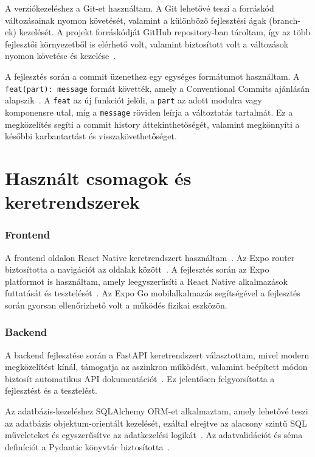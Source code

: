 \documentclass[
]{thesis-ekf}
\theoremstyle{definition}
\theoremstyle{remark}
\begin{document}
A verziókezeléshez a Git-et használtam. A Git lehetővé teszi a forráskód változásainak nyomon követését, valamint a különböző fejlesztési ágak (branch-ek) kezelését. A projekt forráskódját GitHub repository-ban tároltam, így az több fejlesztői környezetből is elérhető volt, valamint biztosított volt a változások nyomon követése és kezelése~\cite{git, github}.

A fejlesztés során a commit üzenethez egy egységes formátumot használtam. A \texttt{feat(part): message} formát követték, amely a Conventional Commits ajánlásán alapszik~\cite{conventional_commits}. A \texttt{feat} az új funkciót jelöli, a \texttt{part} az adott modulra vagy komponensre utal, míg a \texttt{message} röviden leírja a változtatás tartalmát. Ez a megközelítés segíti a commit history áttekinthetőségét, valamint megkönnyíti a későbbi karbantartást és visszakövethetőséget. 

\section{Használt csomagok és keretrendszerek}

\subsubsection{Frontend}
A frontend oldalon React Native keretrendszert használtam~\cite{react_native_book}. Az Expo router biztosította a navigációt az oldalak között~\cite{expo_router}. A fejlesztés során az Expo platformot is használtam, amely leegyszerűsíti a React Native alkalmazások futtatását és tesztelését~\cite{expo}. Az Expo Go mobilalkalmazás segítségével a fejlesztés során gyorsan ellenőrizhető volt a működés fizikai eszközön.

\subsubsection{Backend}
A backend fejlesztése során a FastAPI keretrendszert választottam, mivel modern megközelítést kínál, támogatja az aszinkron működést, valamint beépített módon biztosít automatikus API dokumentációt~\cite{fastapi}. Ez jelentősen felgyorsította a fejlesztést és a tesztelést.

Az adatbázis-kezeléshez SQLAlchemy ORM-et alkalmaztam, amely lehetővé teszi az adatbázis objektum-orientált kezelését, ezáltal elrejtve az alacsony szintű SQL műveleteket és egyszerűsítve az adatkezelési logikát~\cite{sqlalchemy}. Az adatvalidációt és séma definíciót a Pydantic könyvtár biztosította~\cite{pydantic}.
\end{document}
